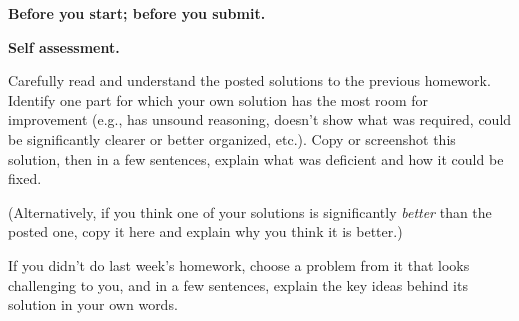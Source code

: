 \documentclass[11pt,addpoints,answers]{exam}
\begin{document}
\hwpreface

\begin{questions}

  \addtocounter{question}{-1}
  \question[0] \textbf{Before you start; before you submit.} \nopagebreak

  \question[10] \textbf{Self assessment.} \nopagebreak
  
  Carefully read and understand the posted solutions to the previous homework.
  Identify one part for which your own solution has the most room for improvement (e.g., has unsound reasoning, doesn’t show what was required, could be significantly clearer or better organized, etc.).
  Copy or screenshot this solution, then in a few sentences, explain what was deficient and how it could be fixed.

  (Alternatively, if you think one of your solutions is significantly \emph{better} than the posted one, copy it here and explain why you think it is better.)

  If you didn't do last week's homework, choose a problem from it that looks challenging to you, and in a few sentences, explain the key ideas behind its solution in your own words.


\end{questions}
\end{document}
